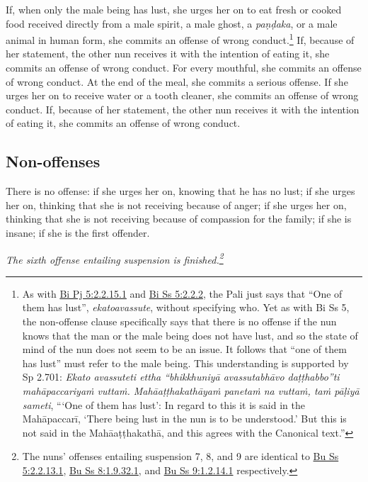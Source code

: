 \documentclass[12pt,openany]{book}%
\newcommand*{\scendsutta}[1]{\begin{Center}\textit{#1}\end{Center}\addvspace{1em}}
\begin{document}
If, when only the male being has lust, she urges her on to eat fresh or cooked food received directly from a male spirit, a male ghost, a \textit{\textsanskrit{paṇḍaka}}, or a male animal in human form, she commits an offense of wrong conduct.\footnote{As with \href{https://suttacentral.net/pli-tv-bi-vb-pj5/en/brahmali\#2.2.15.1}{Bi Pj 5:2.2.15.1} and \href{https://suttacentral.net/pli-tv-bi-vb-ss5/en/brahmali\#2.2.2}{Bi Ss 5:2.2.2}, the Pali just says that “One of them has lust”, \textit{ekatoavassute}, without specifying who. Yet as with Bi Ss 5, the non-offense clause specifically says that there is no offense if the nun knows that the man or the male being does not have lust, and so the state of mind of the nun does not seem to be an issue. It follows that “one of them has lust” must refer to the male being. This understanding is supported by Sp 2.701: \textit{Ekato avassuteti ettha “\textsanskrit{bhikkhuniyā} \textsanskrit{avassutabhāvo} \textsanskrit{daṭṭhabbo}”ti \textsanskrit{mahāpaccariyaṁ} \textsanskrit{vuttaṁ}. \textsanskrit{Mahāaṭṭhakathāyaṁ} \textsanskrit{panetaṁ} na \textsanskrit{vuttaṁ}, \textsanskrit{taṁ} \textsanskrit{pāḷiyā} sameti}, “‘One of them has lust’: In regard to this it is said in the \textsanskrit{Mahāpaccarī}, ‘There being lust in the nun is to be understood.’ But this is not said in the \textsanskrit{Mahāaṭṭhakathā}, and this agrees with the Canonical text.” } If, because of her statement, the other nun receives it with the intention of eating it, she commits an offense of wrong conduct. For every mouthful, she commits an offense of wrong conduct. At the end of the meal, she commits a serious offense. If she urges her on to receive water or a tooth cleaner, she commits an offense of wrong conduct. If, because of her statement, the other nun receives it with the intention of eating it, she commits an offense of wrong conduct. 

\subsection*{Non-offenses }

There is no offense: if she urges her on, knowing that he has no lust;  if she urges her on, thinking that she is not receiving because of anger;  if she urges her on, thinking that she is not receiving because of compassion for the family;  if she is insane;  if she is the first offender. 

\scendsutta{The sixth offense entailing suspension is finished.\footnote{The nuns’ offenses entailing suspension 7, 8, and 9 are identical to \href{https://suttacentral.net/pli-tv-bu-vb-ss5/en/brahmali\#2.2.13.1}{Bu Ss 5:2.2.13.1}, \href{https://suttacentral.net/pli-tv-bu-vb-ss8/en/brahmali\#1.9.32.1}{Bu Ss 8:1.9.32.1}, and \href{https://suttacentral.net/pli-tv-bu-vb-ss9/en/brahmali\#1.2.14.1}{Bu Ss 9:1.2.14.1} respectively. } }
\end{document}
